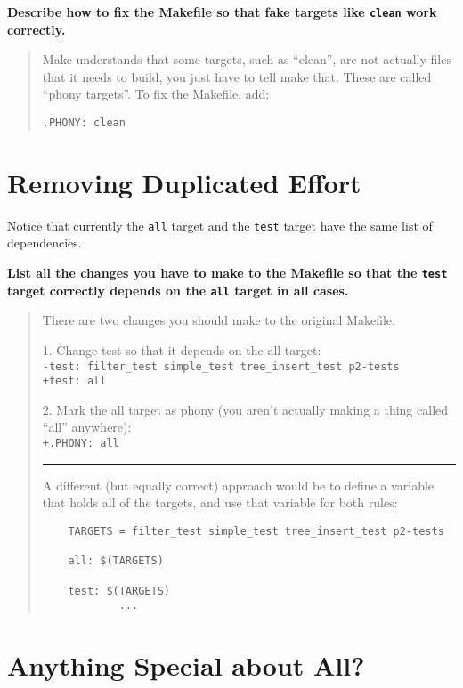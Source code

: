 \documentclass{article}
\begin{document}
\textbf{Describe how to fix the Makefile so that fake targets like \texttt{clean} work correctly.}
\begin{quote}
  \color{violet}
  Make understands that some targets, such as ``clean'', are not actually
  files that it needs to build, you just have to tell make that. These are
  called ``phony targets''. To fix the Makefile, add:

  \texttt{.PHONY: clean}
\end{quote}

\section{Removing Duplicated Effort}

Notice that currently the \texttt{all} target and the \texttt{test} target
have the same list of dependencies.

\textbf{List all the changes you have to make to the Makefile so that the
  \texttt{test} target correctly depends on the \texttt{all} target in all
  cases.}
\begin{quote}
  \color{violet}
  There are two changes you should make to the original Makefile.

  1. Change test so that it depends on the all target:\\
  \texttt{\color{red}-test: filter\_test simple\_test tree\_insert\_test p2-tests}\\
  \texttt{\color{ForestGreen}+test: all}

  2. Mark the all target as phony (you aren't actually making a thing called
  ``all'' anywhere):\\
  \texttt{\color{ForestGreen}+.PHONY: all}

  \bigskip
  \hrule
  \bigskip

  A different (but equally correct) approach would be to define a variable
  that holds all of the targets, and use that variable for both rules:
  \begin{lstlisting}
    TARGETS = filter_test simple_test tree_insert_test p2-tests

    all: $(TARGETS)

    test: $(TARGETS)
            ...
  \end{lstlisting}
\end{quote}

\section{Anything Special about All?}
\label{q:all}
\end{document}
